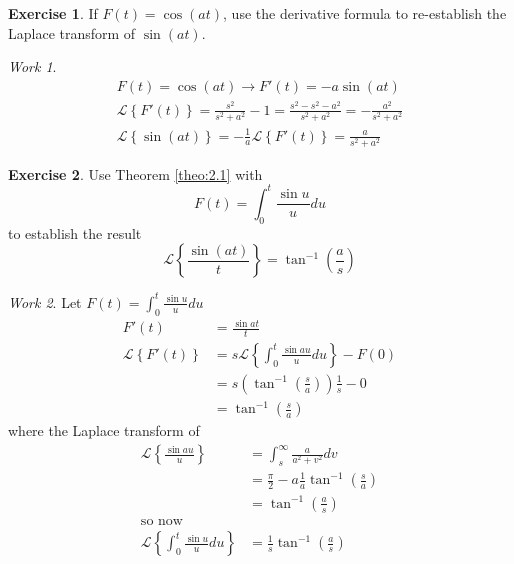 \documentclass{report}
\theoremstyle{definition}
\newtheorem{exercise}{Exercise}[chapter]
\theoremstyle{remark}
\newtheorem*{work}{Work}
\newcommand{\lapt}[1]{\mathscr{L}\left\{ #1\right\}}
\newcommand{\pull}{\! \! \!}
\begin{document}
\begin{exercise}
    If $F(t) = \cos(at)$, use the derivative formula to re-establish the Laplace transform of $\sin(at)$.
\end{exercise}
\begin{work}
    \begin{equation*}
        \begin{split}
            F(t) = \cos (at) \rightarrow F'(t) = -a\sin(at) \\
            \lapt{F'(t)} = \frac{s^2}{s^2+a^2} - 1 =\frac{s^2-s^2-a^2}{s^2+a^2} = -\frac{a^2}{s^2+a^2} \\
            \lapt{\sin(at)} = -\frac{1}{a}\lapt{F'(t)} = \frac{a}{s^2+a^2}
        \end{split}
    \end{equation*}
\end{work}

\begin{exercise}
    Use Theorem \ref{theo:2.1} with 
    \begin{equation*}
        F(t) = \int^t_0 \frac{\sin u }{u}du
    \end{equation*}
    to establish the result
    \begin{equation*}
        \lapt{\frac{\sin (at)}{t}} = \tan^{-1}\left( \frac{a}{s} \right)
    \end{equation*}
\end{exercise}
\begin{work}
    Let $F(t)=\displaystyle{\int^t_0\frac{\sin u}{u}du}$
    \begin{equation*}
    \begin{split}
        F'(t) &= \frac{\sin at}{t}\\
        \lapt{F'(t)}&= s\lapt{\int^t_0\frac{\sin au}{u}du} - F(0) \\
        &=s\left(\tan^{-1}\left( \frac{s}{a} \right)\right)\frac{1}{s} - 0\\
        &= \tan^{-1}\left(\frac{s}{a} \right)
        \end{split}
    \end{equation*}
    where the Laplace transform of 
    \begin{equation*}
    \begin{split}
        \lapt{\frac{\sin au}{u}} &= \int^\infty_s \pull\frac{a}{a^2+v^2}dv \\
        &=\frac{\pi}{2}- a\frac{1}{a}\tan^{-1}\left( \frac{s}{a} \right) \\
        &= \tan^{-1}\left( \frac{a}{s} \right) \\
        \text{so now}\\
        \lapt{\int^t_0\frac{\sin u}{u}du} &= \frac{1}{s}\tan^{-1}\left( \frac{a}{s} \right)
    \end{split}
    \end{equation*}
\end{work}
\end{document}
